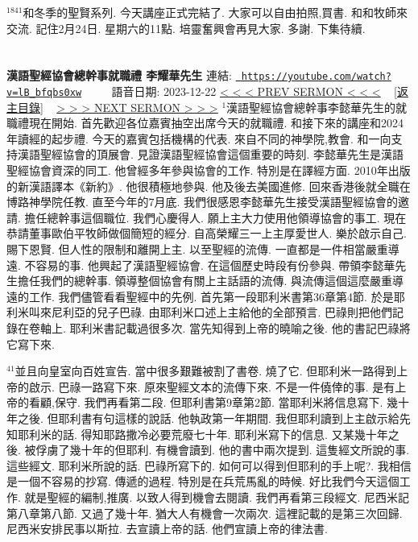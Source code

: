 \documentclass{book}
\begin{document}
$^{1841}$和冬季的聖賢系列.
今天講座正式完結了.
大家可以自由拍照,買書.
和和牧師來交流.
記住2月24日.
星期六的11點.
培靈奮興會再見大家.
多謝.
下集待續.
\newpage



\section{}
\label{sec:lB_bfqbs0xw}
\textbf{漢語聖經協會總幹事就職禮 李耀華先生}
\newline
\newline
連結: \href{https://youtube.com/watch?v=lB_bfqbs0xw}{\texttt{ https://youtube.com/watch?v=lB\_bfqbs0xw}} ~~~~ 語音日期: 2023-12-22 
\newline
\newline
\hyperref[sec:h6V3lBcFI1I]{\small{< < < PREV SERMON < < <}}
~
\hyperref[sec:index]{\small{[返主目錄]}}
~
\hyperref[sec:code]{\small{> > > NEXT SERMON > > >}}
\newline
\newline
$^{1}$漢語聖經協會總幹事李懿華先生的就職禮現在開始.
首先歡迎各位嘉賓抽空出席今天的就職禮.
和接下來的講座和2024年讀經的起步禮.
今天的嘉賓包括機構的代表.
來自不同的神學院,教會.
和一向支持漢語聖經協會的頂展會.
見證漢語聖經協會這個重要的時刻.
李懿華先生是漢語聖經協會資深的同工.
他曾經多年參與協會的工作.
特別是在譯經方面.
2010年出版的新漢語譯本《新約》.
他很積極地參與.
他及後去美國進修.
回來香港後就全職在博路神學院任教.
直至今年的7月底.
我們很感恩李懿華先生接受漢語聖經協會的邀請.
擔任總幹事這個職位.
我們心慶得人.
願上主大力使用他領導協會的事工.
現在恭請董事歐伯平牧師做個簡短的經分.
自高榮耀三一上主厚愛世人.
樂於啟示自己.
賜下恩賢.
但人性的限制和離開上主.
以至聖經的流傳.
一直都是一件相當嚴重導遠.
不容易的事.
他興起了漢語聖經協會.
在這個歷史時段有份參與.
帶領李懿華先生擔任我們的總幹事.
領導整個協會有關上主話語的流傳.
與流傳這個這麼嚴重導遠的工作.
我們儘管看看聖經中的先例.
首先第一段耶利米書第36章第4節.
於是耶利米叫來尼利亞的兒子巴祿.
由耶利米口述上主給他的全部預言.
巴祿則把他們記錄在卷軸上.
耶利米書記載過很多次.
當先知得到上帝的曉喻之後.
他的書記巴祿將它寫下來.

$^{41}$並且向皇室向百姓宣告.
當中很多艱難被割了書卷.
燒了它.
但耶利米一路得到上帝的啟示.
巴祿一路寫下來.
原來聖經文本的流傳下來.
不是一件僥倖的事.
是有上帝的看顧,保守.
我們再看第二段.
但耶利書第9章第2節.
當耶利米將信息寫下.
幾十年之後.
但耶利書有句這樣的說話.
他執政第一年期間.
我但耶利讀到上主啟示給先知耶利米的話.
得知耶路撒冷必要荒廢七十年.
耶利米寫下的信息.
又某幾十年之後.
被俘虜了幾十年的但耶利.
有機會讀到.
他的書中兩次提到.
這隻經文所說的事.
這些經文.
耶利米所說的話.
巴祿所寫下的.
如何可以得到但耶利的手上呢?.
我相信是一個不容易的抄寫.
傳遞的過程.
特別是在兵荒馬亂的時候.
好比我們今天這個工作.
就是聖經的編制,推廣.
以致人得到機會去閱讀.
我們再看第三段經文.
尼西米記第八章第八節.
又過了幾十年.
猶大人有機會一次兩次.
這裡記載的是第三次回歸.
尼西米安排民事以斯拉.
去宣讀上帝的話.
他們宣讀上帝的律法書.
\end{document}
